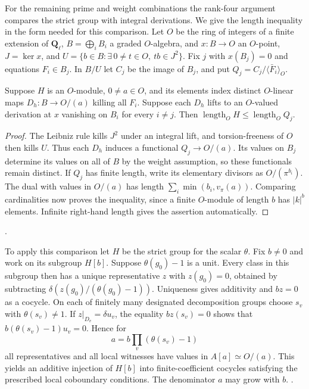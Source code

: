For the remaining prime and weight combinations the rank-four
argument compares the strict group with integral derivations.
We give the length inequality in the form needed for this comparison.
Let \(O\) be the ring of integers of a finite extension of \(\mathbf Q_\ell\),
\(B=\bigoplus_i B_i\) a graded \(O\)-algebra, and \(x:B\to O\)
an \(O\)-point, \(J=\ker x\), and
\(U=\{b\in B:\exists\,0\ne t\in O,\ tb\in J^2\}\).
Fix \(j\) with \(x(B_j)=0\) and equations \(F_i\in B_j\).
In \(B/U\) let \(C_j\) be the image of \(B_j\), and put
\(Q_j=C_j/\langle\bar F_i\rangle_O\).

\begin{lemma}\label{newcoh:cotangent}
Suppose \(H\) is an \(O\)-module, \(0\ne a\in O\), and its elements
index distinct \(O\)-linear maps \(D_h:B\to O/(a)\) killing all
\(F_i\). Suppose each \(D_h\) lifts to an \(O\)-valued derivation
at \(x\) vanishing on \(B_i\) for every \(i\ne j\). Then
\(\operatorname{length}_O H\le\operatorname{length}_O Q_j\).
\end{lemma}
\begin{proof}
The Leibniz rule kills \(J^2\) under an integral lift, and
torsion-freeness of \(O\) then kills \(U\). Thus each \(D_h\)
induces a functional \(Q_j\to O/(a)\). Its values on \(B_j\)
determine its values on all of \(B\) by the weight assumption,
so these functionals remain distinct. If \(Q_j\) has finite length,
write its elementary divisors as \(O/(\pi^{b_i})\). The dual with
values in \(O/(a)\) has length
\(\sum_i\min(b_i,v_\pi(a))\). Comparing cardinalities now proves
the inequality, since a finite \(O\)-module of length \(b\) has
\(|k|^b\) elements. Infinite right-hand length gives the assertion
automatically.
\end{proof}
.

To apply this comparison let \(H\) be the strict group for the
scalar \(\theta\). Fix \(b\ne0\) and work on its subgroup \(H[b]\).
Suppose \(\theta(g_0)-1\) is a unit. Every class in this subgroup
then has a unique representative \(z\) with \(z(g_0)=0\), obtained
by subtracting \(\delta(z(g_0)/(\theta(g_0)-1))\).
Uniqueness gives additivity and \(bz=0\) as a cocycle. On each of
finitely many designated decomposition groups choose \(s_v\) with
\(\theta(s_v)\ne1\). If \(z|_{D_v}=\delta u_v\), the equality
\(bz(s_v)=0\) shows that \(b(\theta(s_v)-1)u_v=0\). Hence for
\[
 a=b\prod_v(\theta(s_v)-1)
\]
all representatives and all local witnesses have values in
\(A[a]\simeq O/(a)\). This yields an additive injection of \(H[b]\)
into finite-coefficient cocycles satisfying the prescribed local
coboundary conditions. The denominator \(a\) may grow with \(b\).
.

